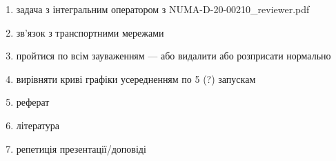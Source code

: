 \begin{enumerate}
    \item задача з інтегральним оператором з NUMA-D-20-00210\_reviewer.pdf
    \item зв'язок з транспортними мережами
    \item пройтися по всім зауваженням --- або видалити або розприсати нормально
    \item вирівняти криві графіки усередненням по 5 (?) запускам
    \item реферат
    \item література
    \item репетиція презентації/доповіді
\end{enumerate} 